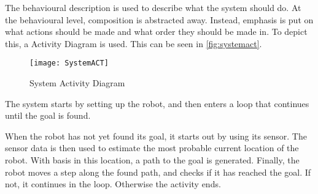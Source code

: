 \documentclass[Main]{subfiles}
\begin{document}
		The behavioural description is used to describe what the system should do.
		At the behavioural level, composition is abstracted away. 
		Instead, emphasis is put on what actions should be made and what order they should be made in.
		To depict this, a Activity Diagram is used. This can be seen in \autoref{fig:systemact}.
		
		\begin{figure}[H]
			\centering
			\texttt{[image: SystemACT]}
			\caption{System Activity Diagram}
			\label{fig:systemact}
		\end{figure}
		
		The system starts by setting up the robot, and then enters a loop that continues until the goal is found.
		
		When the robot has not yet found its goal, it starts out by using its sensor.
		The sensor data is then used to estimate the most probable current location of the robot.
		With basis in this location, a path to the goal is generated.
		Finally, the robot moves a step along the found path, and checks if it has reached the goal.
		If not, it continues in the loop. Otherwise the activity ends.


\end{document}
